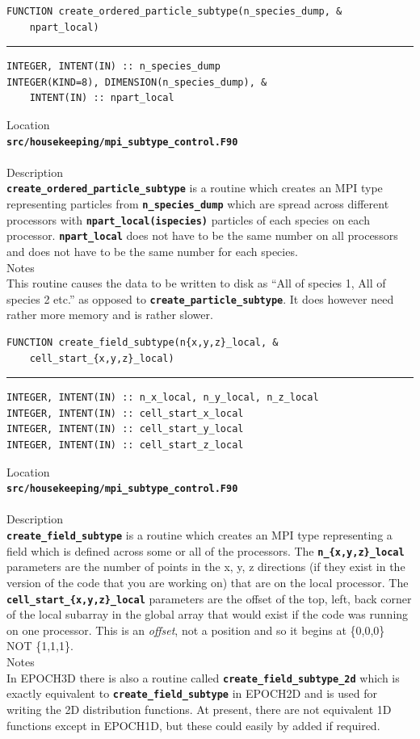 \documentclass[12pt,a4paper]{article}
\newcommand{\HRule}{\rule{\linewidth}{0.5mm}}
\newcommand{\inlinecode}[1]{{\color{warwickred} \bf\texttt{#1}}}
\newcommand{\codedef}{\begin{Verbatim}[formatcom=\color{warwickred},fontsize=\Large,hfuzz=0pt]}
\newcommand{\coderule}{
{\color{warwickred}\vspace{-0.5cm}\HRule}
\codedef}
\begin{document}
\pagebreak
\codedef
FUNCTION create_ordered_particle_subtype(n_species_dump, &
    npart_local)
\end{Verbatim}
\coderule
INTEGER, INTENT(IN) :: n_species_dump
INTEGER(KIND=8), DIMENSION(n_species_dump), &
    INTENT(IN) :: npart_local
\end{Verbatim}
\vspace{1cm}
{\Large Location\\}
\inlinecode{src/housekeeping/mpi\_subtype\_control.F90}\\
\\[0.5cm]
{\Large Description\\}
\inlinecode{create\_ordered\_particle\_subtype} is a routine which creates an
MPI type representing particles from \inlinecode{n\_species\_dump} which are
spread across different processors with \inlinecode{npart\_local(ispecies)}
particles of each species on each processor. \inlinecode{npart\_local} does not
have to be the same number on all processors and does not have to be the same
number for each species.
\\[0.5cm]
{\Large Notes\\}
This routine causes the data to be written to disk as ``All of species 1, All of
species 2 etc.'' as opposed to \inlinecode{create\_particle\_subtype}. It does
however need rather more memory and is rather slower.

\pagebreak
\codedef
FUNCTION create_field_subtype(n{x,y,z}_local, &
    cell_start_{x,y,z}_local)
\end{Verbatim}
\coderule
INTEGER, INTENT(IN) :: n_x_local, n_y_local, n_z_local
INTEGER, INTENT(IN) :: cell_start_x_local
INTEGER, INTENT(IN) :: cell_start_y_local
INTEGER, INTENT(IN) :: cell_start_z_local
\end{Verbatim}
\vspace{1cm}
{\Large Location\\}
\inlinecode{src/housekeeping/mpi\_subtype\_control.F90}\\
\\[0.5cm]
{\Large Description\\}
\inlinecode{create\_field\_subtype} is a routine which creates an MPI type
representing a field which is defined across some or all of the processors. The
\inlinecode{n\_\{x,y,z\}\_local} parameters are the number of points in the x,
y, z directions (if they exist in the version of the code that you are working
on) that are on the local processor. The
\inlinecode{cell\_start\_\{x,y,z\}\_local} parameters are the offset of the
top, left, back corner of the local subarray in the global array that would
exist if the code was running on one processor. This is an {\it offset}, not a
position and so it begins at \{0,0,0\} NOT \{1,1,1\}.
\\[0.5cm]
{\Large Notes\\}
In EPOCH3D there is also a routine called
\inlinecode{create\_field\_subtype\_2d} which is exactly equivalent to
\inlinecode{create\_field\_subtype} in EPOCH2D and is used for writing the 2D
distribution functions. At present, there are not equivalent 1D functions
except in EPOCH1D, but these could easily by added if required.
\end{document}
